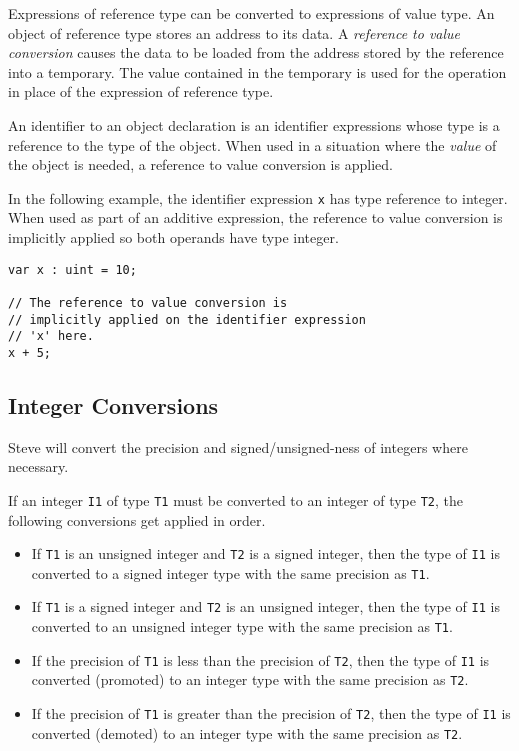 Expressions of reference type can be converted to expressions of value type. An object of reference type stores an address to its data. A \textit{reference to value conversion} causes the data to be loaded from the address stored by the reference into a temporary. The value contained in the temporary is used for the operation in place of the expression of reference type.

An identifier to an object declaration is an identifier expressions whose type is a reference to the type of the object. When used in a situation where the \textit{value} of the object is needed, a reference to value conversion is applied. 

In the following example, the identifier expression \texttt{x} has type reference to integer. When used as part of an additive expression, the reference to value conversion is implicitly applied so both operands have type integer.

\noindent\begin{minipage}{\linewidth}
\begin{lstlisting}
var x : uint = 10;

// The reference to value conversion is
// implicitly applied on the identifier expression
// 'x' here.
x + 5;
\end{lstlisting}
\end{minipage}

\subsection{Integer Conversions} \label{int_conv}

Steve will convert the precision and signed/unsigned-ness of integers where necessary.

If an integer \texttt{I1} of type \texttt{T1} must be converted to an integer of type \texttt{T2}, the following conversions get applied in order.

\begin{itemize}
\item If \texttt{T1} is an unsigned integer and \texttt{T2} is a signed integer, then the type of \texttt{I1} is converted to a signed integer type with the same precision as \texttt{T1}.

\item If \texttt{T1} is a signed integer and \texttt{T2} is an unsigned integer, then the type of \texttt{I1} is converted to an unsigned integer type with the same precision as \texttt{T1}.

\item If the precision of \texttt{T1} is less than the precision of \texttt{T2}, then the type of \texttt{I1} is converted (promoted) to an integer type with the same precision as \texttt{T2}.

\item If the precision of \texttt{T1} is greater than the precision of \texttt{T2}, then the type of \texttt{I1} is converted (demoted) to an integer type with the same precision as \texttt{T2}.
\end{itemize}

